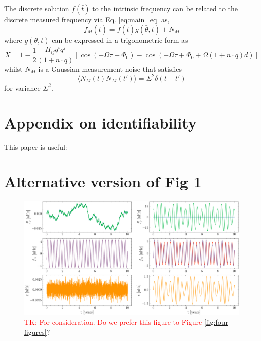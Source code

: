 \documentclass[fleqn,usenatbib,useAMS]{mnras}
\begin{document}
The discrete solution $f(\bar{t})$ to the intrinsic frequency can be related to the discrete measured frequency via Eq. \ref{eq:main_eq} as,
\begin{equation}
	f_M (\bar{t})= f(\bar{t}) g(\bar{\theta},\bar{t}) + N_M
\end{equation}
where $g(\theta,t)$ can be expressed in a trigonometric form as 
\begin{equation}
	X = 1 - \frac{1}{2} \frac{ H_{ij}q^i q^j }{(1 + \bar{n}\cdot \bar{q}) } \left[ \cos(-\Omega \tau +\Phi_0) - \cos(-\Omega \tau +\Phi_0 + \Omega (1 + \bar{n}\cdot \bar{q})  d) \right]
\end{equation} 
whilst $N_M$ is a Gaussian measurement noise that satisfies 
\begin{equation}
	\langle N_M(t) N_M(t') \rangle = \Sigma^2 \delta(t - t')
\end{equation}
for variance $\Sigma^2$. 



\section{Appendix on identifiability}\label{appendix_identifiability}






This paper is useful: \citep{KARLSSON2012941} \citep{SEDOGLAVIC2002735}
\section{Alternative version of Fig 1}




\begin{figure}
	\centering
	\includegraphics[width=\textwidth]{images/Kalman_example_both}
	\caption{\textcolor{red}{TK: For consideration. Do we prefer this figure to Figure \ref{fig:four figures}}?}
	\label{fig:kalmanexampleboth}
\end{figure}
\end{document}
